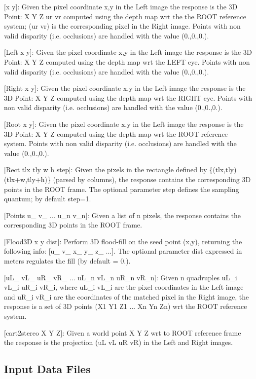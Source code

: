 \begin{DoxyItemize}
\begin{DoxyItemize}
\item \mbox{[}x y\mbox{]}\+: Given the pixel coordinate x,y in the Left image the response is the 3\+D Point\+: X Y Z ur vr computed using the depth map wrt the the R\+O\+O\+T reference system; (ur vr) is the corresponding pixel in the Right image. Points with non valid disparity (i.\+e. occlusions) are handled with the value (0.,0.,0.).
\item \mbox{[}Left x y\mbox{]}\+: Given the pixel coordinate x,y in the Left image the response is the 3\+D Point\+: X Y Z computed using the depth map wrt the L\+E\+F\+T eye. Points with non valid disparity (i.\+e. occlusions) are handled with the value (0.,0.,0.).
\item \mbox{[}Right x y\mbox{]}\+: Given the pixel coordinate x,y in the Left image the response is the 3\+D Point\+: X Y Z computed using the depth map wrt the R\+I\+G\+H\+T eye. Points with non valid disparity (i.\+e. occlusions) are handled with the value (0.,0.,0.).
\item \mbox{[}Root x y\mbox{]}\+: Given the pixel coordinate x,y in the Left image the response is the 3\+D Point\+: X Y Z computed using the depth map wrt the R\+O\+O\+T reference system. Points with non valid disparity (i.\+e. occlusions) are handled with the value (0.,0.,0.).
\item \mbox{[}Rect tlx tly w h step\mbox{]}\+: Given the pixels in the rectangle defined by \{(tlx,tly) (tlx+w,tly+h)\} (parsed by columns), the response contains the corresponding 3\+D points in the R\+O\+O\+T frame. The optional parameter step defines the sampling quantum; by default step=1.
\item \mbox{[}Points u\+\_ v\+\_ ... u\+\_\+n v\+\_\+n\mbox{]}\+: Given a list of n pixels, the response contains the corresponding 3\+D points in the R\+O\+O\+T frame.
\item \mbox{[}Flood3\+D x y dist\mbox{]}\+: Perform 3\+D flood-\/fill on the seed point (x,y), returning the following info\+: \mbox{[}u\+\_ v\+\_ x\+\_ y\+\_ z\+\_ ...\mbox{]}. The optional parameter dist expressed in meters regulates the fill (by default = 0.).
\item \mbox{[}u\+L\+\_ v\+L\+\_ u\+R\+\_ v\+R\+\_ ... u\+L\+\_\+n v\+L\+\_\+n u\+R\+\_\+n v\+R\+\_\+n\mbox{]}\+: Given n quadruples u\+L\+\_\+i v\+L\+\_\+i u\+R\+\_\+i v\+R\+\_\+i, where u\+L\+\_\+i v\+L\+\_\+i are the pixel coordinates in the Left image and u\+R\+\_\+i v\+R\+\_\+i are the coordinates of the matched pixel in the Right image, the response is a set of 3\+D points (X1 Y1 Z1 ... Xn Yn Zn) wrt the R\+O\+O\+T reference system.
\item \mbox{[}cart2stereo X Y Z\mbox{]}\+: Given a world point X Y Z wrt to R\+O\+O\+T reference frame the response is the projection (u\+L v\+L u\+R v\+R) in the Left and Right images.
\end{DoxyItemize}
\end{DoxyItemize}\hypertarget{group__SFM_in_files_sec}{}\subsection{Input Data Files}\label{group__SFM_in_files_sec}
